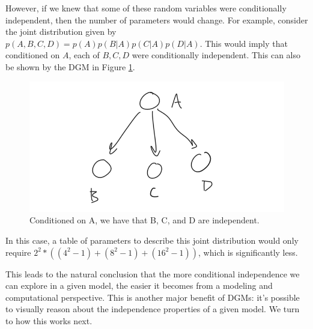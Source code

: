 However, if we knew that some of these random variables were conditionally independent, then the number of parameters would change. For example, consider the joint distribution given by $p(A, B, C, D) = p(A)p(B|A)p(C|A)p(D|A)$. This would imply that conditioned on $A$, each of $B, C, D$ were conditionally independent. This can also be shown by the DGM in Figure \ref{fig:complexity-dgm}.
\begin{figure}
	\centering
	\includegraphics[width=0.5\paperwidth]{../GraphicalModels/fig/complexity-dgm.png}
    \caption{Conditioned on A, we have that B, C, and D are independent.}
	\label{fig:complexity-dgm}
\end{figure}

In this case, a table of parameters to describe this joint distribution would only require $2^2 * ((4^2 - 1) + (8^2 - 1) + (16^2 - 1))$, which is significantly less.

This leads to the natural conclusion that the more conditional independence we can explore in a given model, the easier it becomes from a modeling and computational perspective. This is another major benefit of DGMs: it's possible to visually reason about the independence properties of a given model. We turn to how this works next.

